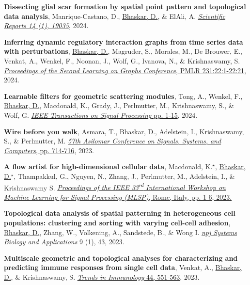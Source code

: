 \documentclass[margin,line]{res}
\begin{document}
\begin{resume}
{\begin{etaremune}[start=20]
\item{\bf Dissecting glial scar formation by spatial point pattern and topological data analysis},
Manrique-Castano, D., \underline{Bhaskar, D.}, \& ElAli, A. 
\href{https://doi.org/10.1038/s41598-024-69426-z}{\textit{Scientific Reports 14 (1), 19035}}, 2024.

\item{\bf Inferring dynamic regulatory interaction graphs from time series data with perturbations},
\underline{Bhaskar, D.}, Magruder, S., Morales, M., De Brouwer, E., Venkat, A., Wenkel, F., Noonan, J., Wolf, G., Ivanova, N., \& Krishnaswamy, S.
\href{https://proceedings.mlr.press/v231/bhaskar24a}{\textit{Proceedings of the Second Learning on Graphs Conference}, PMLR 231:22:1-22:21}, 2024.

\item{\bf Learnable filters for geometric scattering modules},
Tong, A., Wenkel, F., \underline{Bhaskar, D.}, Macdonald, K., Grady, J., Perlmutter, M., Krishnaswamy, S., \& Wolf, G.
\href{https://doi.org/10.1109/TSP.2024.3378001}{\textit{IEEE Transactions on Signal Processing} pp. 1-15}, 2024.

\item{\bf Wire before you walk},
Asmara, T., \underline{Bhaskar, D.}, Adelstein, I., Krishnaswamy, S., \& Perlmutter, M.
\href{https://ieeexplore.ieee.org/abstract/document/10477089}{\textit{57th Asilomar Conference on Signals, Systems, and Computers}, pp. 714-716}, 2023.

\item{\bf A flow artist for high-dimensional cellular data},
Macdonald, K.$^\star$, \underline{Bhaskar, D.}$^\star$, Thampakkul, G., Nguyen, N., Zhang, J., Perlmutter, M., Adelstein, I., \& Krishnaswamy S.
\href{https://doi.org/10.1109/MLSP55844.2023.10285942}{\textit{Proceedings of the IEEE 33\textsuperscript{rd} International Workshop on Machine Learning for Signal Processing (MLSP)}, Rome, Italy, pp. 1-6, 2023.}

\item{\bf Topological data analysis of spatial patterning in heterogeneous cell populations: clustering and sorting with varying cell-cell adhesion},
\underline{Bhaskar, D.}, Zhang, W., Volkening, A., Sandstede, B., \& Wong I.
\href{https://www.nature.com/articles/s41540-023-00302-8}{\textit{npj Systems Biology and Applications} 9 (1), 43}, 2023.
\vspace*{.1cm}

\item{\bf Multiscale geometric and topological analyses for characterizing and predicting immune responses from single cell data},
Venkat, A., \underline{Bhaskar, D.}, \& Krishnaswamy, S.
\href{https://doi.org/10.1016/j.it.2023.05.003}{\textit{Trends in Immunology} 44, 551-563}, 2023.
\vspace*{.1cm}


\end{etaremune}}
\end{resume}
\end{document}
